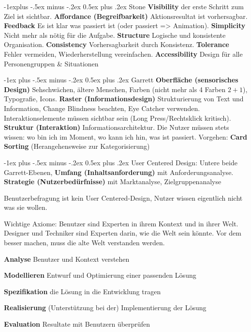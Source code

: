 \documentclass[a4paper, fontsize=6pt]{scrartcl}
\makeatletter
\renewcommand{\section}{\@startsection{section}{1}{0mm}%
    {-1ex plus -.5ex minus -.2ex}%
    {0.5ex plus .2ex}%
    {\normalfont\large\bfseries}}
\renewcommand{\subsection}{\@startsection{subsection}{2}{0mm}%
    {-1explus -.5ex minus -.2ex}%
    {0.5ex plus .2ex}%
    {\normalfont\normalsize\bfseries}}
\makeatother
\begin{document}
\begin{multicols*}{5}
\subsection{Stone} \textbf{Visibility} der erste Schritt zum Ziel ist sichtbar. \textbf{Affordance (Begreifbarkeit)} Aktionsresultat ist vorhersagbar. \textbf{Feedback} Es ist klar was passiert ist (oder passiert => Animation). \textbf{Simplicity} Nicht mehr als nötig für die Aufgabe. \textbf{Structure} Logische und konsistente Organisation. \textbf{Consistency} Vorhersagbarkeit durch Konsistenz. \textbf{Tolerance} Fehler vermeiden, Wiederherstellung vereinfachen. \textbf{Accessibility} Design für alle Personengruppen \& Situationen

\section{Garrett}
\textbf{Oberfläche (sensorisches Design)} Sehschwächen, ältere Menschen, Farben (nicht mehr als 4 Farben $2+1$), Typografie, Icons. \textbf{Raster (Informationsdesign)} Strukturierung von Text und Information, Change Blindness beachten, Eye Catcher verwenden. Interaktionselemente müssen sichtbar sein (Long Press/Rechtsklick kritisch). \textbf{Struktur (Interaktion)} Informationsarchitektur. Die Nutzer müssen stets wissen: wo bin ich im Moment, wo kann ich hin, was ist passiert. Vorgehen: \textbf{Card Sorting} (Herangehensweise zur Kategorisierung)

\section{User Centered Design:}
Untere beide Garrett-Ebenen, \textbf{Umfang (Inhaltsanforderung)} mit Anforderungsanalyse. \textbf{Strategie (Nutzerbedürfnisse)} mit Marktanalyse, Zielgruppenanalyse

Benutzerbefragung ist kein User Centered-Design, Nutzer wissen eigentlich nicht was sie wollen. 

Wichtige Axiome: Benutzer sind Experten in ihrem Kontext und in ihrer Welt. Designer und Techniker sind Experten darin, wie die Welt sein könnte. Vor dem besser machen, muss die alte Welt verstanden werden.

\textbf{Analyse} Benutzer und Kontext verstehen

\textbf{Modellieren} Entwurf und Optimierung einer passenden Lösung

\textbf{Spezifikation} die Lösung in die Entwicklung tragen

\textbf{Realisierung} (Unterstützung bei der) Implementierung der Lösung

\textbf{Evaluation} Resultate mit Benutzern überprüfen

\end{multicols*}
\end{document}
